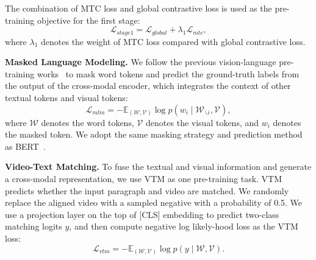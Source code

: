 \documentclass{article}
\begin{document}
The combination of MTC loss and global contrastive loss is used as the pre-training objective for the first stage:
\begin{equation}
\mathcal{L}_{stage1}=  \mathcal{L}_{global}+\lambda_1 \mathcal{L}_{mtc},
\end{equation}
where $\lambda_1$ denotes the weight of MTC loss compared with global contrastive loss.


\textbf{Masked Language Modeling.} 
We follow the previous vision-language pre-training works~\cite{huang2020pixelbert,li2021albef,xue2021probing} to mask word tokens and predict the ground-truth labels from the output of the cross-modal encoder, which integrates the context of other textual tokens and visual tokens:
\begin{equation}
\mathcal{L}_{mlm}=-\mathbb{E}_{(\mathcal{W}, \mathcal{V})} \log p\left(w_{i} \mid \mathcal{W}_{\backslash i}, \mathcal{V}\right),
\end{equation}
where $\mathcal{W}$ denotes the word tokens, $\mathcal{V}$ denotes the visual tokens, and $w_i$ denotes the masked token. We adopt the same masking strategy and prediction method as BERT~\cite{Devlin2018bert}.

\textbf{Video-Text Matching.}
To fuse the textual and visual information and generate a cross-modal representation, we use VTM as one pre-training task. VTM predicts whether the input paragraph and video are matched. We randomly replace the aligned video with a sampled negative with a probability of 0.5. We use a projection layer on the top of [CLS] embedding to predict two-class matching logits $y$, and then compute negative log likely-hood loss as the VTM loss:
\begin{equation}
\mathcal{L}_{vtm}=-\mathbb{E}_{(\mathcal{W}, \mathcal{V})} \log p\left(y \mid \mathcal{W}, \mathcal{V}\right).
\end{equation}
\end{document}
